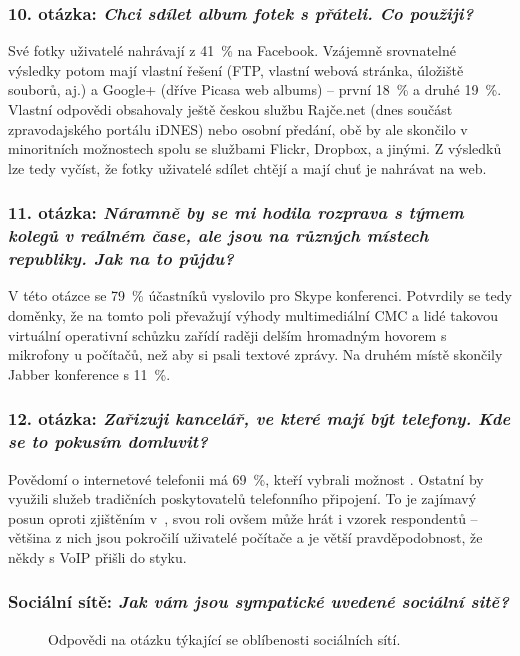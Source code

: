 \documentclass[12pt,oneside,final]{fithesis2}
\begin{document}
\subsubsection*{\textbf{10. otázka:} \emph{Chci sdílet album fotek s přáteli. Co použiji?}}
Své fotky uživatelé nahrávají z 41~\% na Facebook. Vzájemně srovnatelné výsledky potom mají vlastní řešení (FTP, vlastní webová stránka, úložiště souborů, aj.) a Google+ (dříve Picasa web albums) -- první 18~\% a druhé 19~\%. Vlastní odpovědi obsahovaly ještě českou službu Rajče.net (dnes součást zpravodajského portálu iDNES) nebo osobní předání, obě by ale skončilo v minoritních možnostech spolu se službami Flickr, Dropbox, a jinými. Z výsledků lze tedy vyčíst, že fotky uživatelé sdílet chtějí a mají chuť je nahrávat na web.

\subsubsection*{\textbf{11. otázka:} \emph{Náramně by se mi hodila rozprava s týmem kolegů v reálném čase, ale jsou na různých místech republiky. Jak na to půjdu?}}
V této otázce se 79~\% účastníků vyslovilo pro Skype konferenci. Potvrdily se tedy doměnky, že na tomto poli převažují výhody multimediální CMC a lidé takovou virtuální operativní schůzku zařídí raději delším hromadným hovorem s mikrofony u počítačů, než aby si psali textové zprávy. Na druhém místě skončily Jabber konference s 11~\%.

\subsubsection*{\textbf{12. otázka:} \emph{Zařizuji kancelář, ve které mají být telefony. Kde se to pokusím domluvit?}}
Povědomí o internetové telefonii má 69~\%, kteří vybrali možnost . Ostatní by využili služeb tradičních poskytovatelů telefonního připojení. To je zajímavý posun oproti zjištěním v~\cite{latif2007adoption}, svou roli ovšem může hrát i vzorek respondentů -- většina z nich jsou pokročilí uživatelé počítače a je větší pravděpodobnost, že někdy s VoIP přišli do styku.

\subsubsection*{\textbf{Sociální sítě:} \emph{Jak vám jsou sympatické uvedené sociální sitě?}}
\begin{figure}[h]
    \centering


    \caption{Odpovědi na otázku týkající se oblíbenosti sociálních sítí.}
\end{figure}
\end{document}
